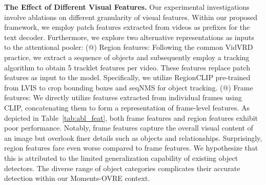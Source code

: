 \documentclass[letterpaper]{article}
\makeatletter
\newcommand{\Rmnum}[1]{\expandafter\@slowromancap\romannumeral #1@}
\makeatother
\begin{document}
\noindent \textbf{The Effect of Different Visual Features.}
Our experimental investigations involve ablations on different granularity of visual features. Within our proposed framework, we employ patch features extracted from videos as prefixes for the text decoder. Furthermore, we explore two alternative representations as inputs to the attentional pooler:
(\Rmnum{1}) Region features: Following the common VidVRD practice, we extract a sequence of objects and subsequently employ a tracking algorithm to obtain 5 tracklet features per video. These features replace patch features as input to the model. Specifically, we utilize RegionCLIP \cite{zhong2021regionclip} pre-trained from LVIS to crop bounding boxes and seqNMS \cite{han2016seqnms} for object tracking.
(\Rmnum{2}) Frame features: We directly utilize features extracted from individual frames using CLIP, concatenating them to form a representation of frame-level features.
As depicted in Table~\ref{tab:abl_feat}, both frame features and region features exhibit poor performance. Notably, frame features capture the overall visual content of an image but overlook finer details such as objects and relationships. Surprisingly, region features fare even worse compared to frame features. We hypothesize that this is attributed to the limited generalization capability of existing object detectors. The diverse range of object categories complicates their accurate detection within our Moments-OVRE context.
\end{document}
